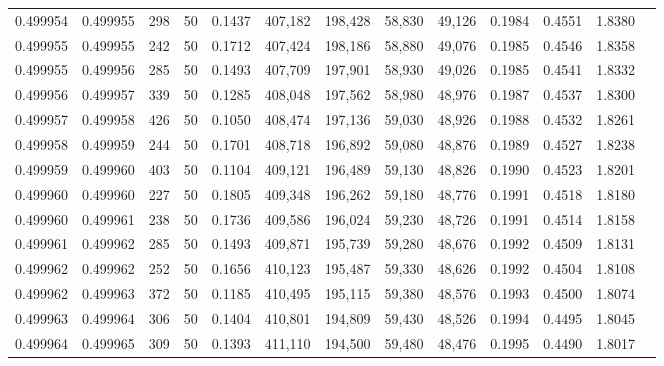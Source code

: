 \begin{tabular}{rrrrrrrrrrrrr}
0.499954 & 0.499955 & 298 &  50 &                                     0.1437 & 407,182 & 198,428 &  58,830 &  49,126 & 0.1984 & 0.4551 & 1.8380 \\
0.499955 & 0.499955 & 242 &  50 &                                     0.1712 & 407,424 & 198,186 &  58,880 &  49,076 & 0.1985 & 0.4546 & 1.8358 \\
0.499955 & 0.499956 & 285 &  50 &                                     0.1493 & 407,709 & 197,901 &  58,930 &  49,026 & 0.1985 & 0.4541 & 1.8332 \\
0.499956 & 0.499957 & 339 &  50 &                                     0.1285 & 408,048 & 197,562 &  58,980 &  48,976 & 0.1987 & 0.4537 & 1.8300 \\
0.499957 & 0.499958 & 426 &  50 &                                     0.1050 & 408,474 & 197,136 &  59,030 &  48,926 & 0.1988 & 0.4532 & 1.8261 \\
0.499958 & 0.499959 & 244 &  50 &                                     0.1701 & 408,718 & 196,892 &  59,080 &  48,876 & 0.1989 & 0.4527 & 1.8238 \\
0.499959 & 0.499960 & 403 &  50 &                                     0.1104 & 409,121 & 196,489 &  59,130 &  48,826 & 0.1990 & 0.4523 & 1.8201 \\
0.499960 & 0.499960 & 227 &  50 &                                     0.1805 & 409,348 & 196,262 &  59,180 &  48,776 & 0.1991 & 0.4518 & 1.8180 \\
0.499960 & 0.499961 & 238 &  50 &                                     0.1736 & 409,586 & 196,024 &  59,230 &  48,726 & 0.1991 & 0.4514 & 1.8158 \\
0.499961 & 0.499962 & 285 &  50 &                                     0.1493 & 409,871 & 195,739 &  59,280 &  48,676 & 0.1992 & 0.4509 & 1.8131 \\
0.499962 & 0.499962 & 252 &  50 &                                     0.1656 & 410,123 & 195,487 &  59,330 &  48,626 & 0.1992 & 0.4504 & 1.8108 \\
0.499962 & 0.499963 & 372 &  50 &                                     0.1185 & 410,495 & 195,115 &  59,380 &  48,576 & 0.1993 & 0.4500 & 1.8074 \\
0.499963 & 0.499964 & 306 &  50 &                                     0.1404 & 410,801 & 194,809 &  59,430 &  48,526 & 0.1994 & 0.4495 & 1.8045 \\
0.499964 & 0.499965 & 309 &  50 &                                     0.1393 & 411,110 & 194,500 &  59,480 &  48,476 & 0.1995 & 0.4490 & 1.8017 \\

\end{tabular}
